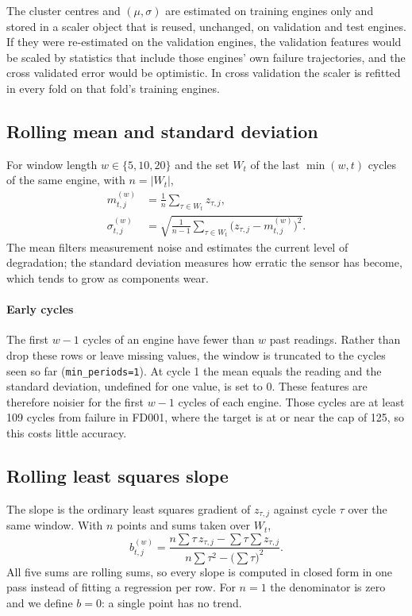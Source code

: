 The cluster centres and $(\mu, \sigma)$ are estimated on training engines
only and stored in a scaler object that is reused, unchanged, on
validation and test engines. If they were re-estimated on the validation
engines, the validation features would be scaled by statistics that
include those engines' own failure trajectories, and the cross validated
error would be optimistic. In cross validation the scaler is refitted in
every fold on that fold's training engines.

\subsection{Rolling mean and standard deviation}
For window length $w \in \{5, 10, 20\}$ and the set $W_t$ of the last
$\min(w, t)$ cycles of the same engine, with $n = |W_t|$,
\begin{equation}
\begin{aligned}
m^{(w)}_{t,j} &= \frac{1}{n}\sum_{\tau \in W_t} z_{\tau,j},\\
\sigma^{(w)}_{t,j} &= \sqrt{\frac{1}{n - 1}\sum_{\tau \in W_t}
\bigl(z_{\tau,j} - m^{(w)}_{t,j}\bigr)^2}.
\end{aligned}
\end{equation}
The mean filters measurement noise and estimates the current level of
degradation; the standard deviation measures how erratic the sensor has
become, which tends to grow as components wear.

\paragraph{Early cycles} The first $w - 1$ cycles of an engine have fewer
than $w$ past readings. Rather than drop these rows or leave missing values,
the window is truncated to the cycles seen so far (\texttt{min\_periods=1}).
At cycle 1 the mean equals the reading and the standard deviation, undefined
for one value, is set to 0. These features are therefore noisier for the
first $w - 1$ cycles of each engine. Those cycles are at least 109 cycles
from failure in FD001, where the target is at or near the cap of 125, so
this costs little accuracy.

\subsection{Rolling least squares slope}
The slope is the ordinary least squares gradient of $z_{\tau,j}$ against
cycle $\tau$ over the same window. With $n$ points and sums taken over $W_t$,
\begin{equation}
b^{(w)}_{t,j} =
\frac{n \sum \tau\, z_{\tau,j} - \sum \tau \sum z_{\tau,j}}
     {n \sum \tau^2 - \bigl(\sum \tau\bigr)^2}.
\end{equation}
All five sums are rolling sums, so every slope is computed in closed form
in one pass instead of fitting a regression per row. For $n = 1$ the
denominator is zero and we define $b = 0$: a single point has no trend.


